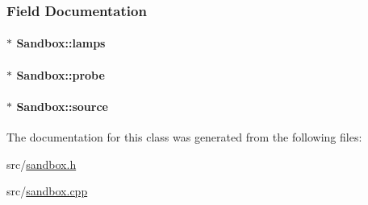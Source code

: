 \subsubsection{\-Field \-Documentation}
\hypertarget{classSandbox_a5aa92c278978a338f564ff7242697ba2}{
\paragraph[{lamps}]{$\ast$ {\bf \-Sandbox\-::lamps}}}\label{classSandbox_a5aa92c278978a338f564ff7242697ba2}
\hypertarget{classSandbox_a68feafc08400bdd9733d7a962232595a}{
\paragraph[{probe}]{$\ast$ {\bf \-Sandbox\-::probe}}}\label{classSandbox_a68feafc08400bdd9733d7a962232595a}
\hypertarget{classSandbox_a10660a3b26800199b24925733855c48d}{
\paragraph[{source}]{$\ast$ {\bf \-Sandbox\-::source}}}\label{classSandbox_a10660a3b26800199b24925733855c48d}


\-The documentation for this class was generated from the following files\-:\begin{DoxyCompactItemize}
\item 
src/\hyperlink{sandbox_8h}{sandbox.\-h}\item 
src/\hyperlink{sandbox_8cpp}{sandbox.\-cpp}\end{DoxyCompactItemize}
